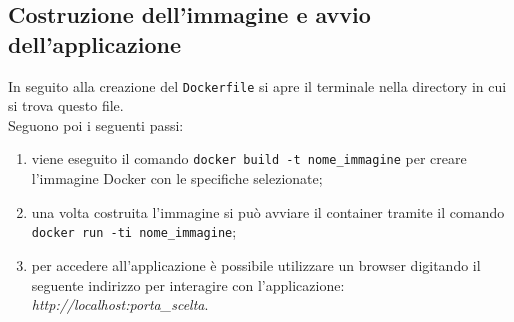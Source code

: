 \subsection{Costruzione dell'immagine e avvio dell'applicazione}
In seguito alla creazione del \texttt{Dockerfile} si apre il terminale nella directory in cui si trova questo file.\\
Seguono poi i seguenti passi:
\begin{enumerate}
\item viene eseguito il comando \texttt{docker build -t nome\_immagine} per creare l'immagine Docker con le specifiche selezionate;
\item una volta costruita l'immagine si può avviare il container tramite il comando \texttt{docker run -ti nome\_immagine}; 
\item per accedere all'applicazione è possibile utilizzare un browser digitando il seguente indirizzo per interagire con l'applicazione: \textit{http://localhost:porta\_scelta}.
\end{enumerate}




